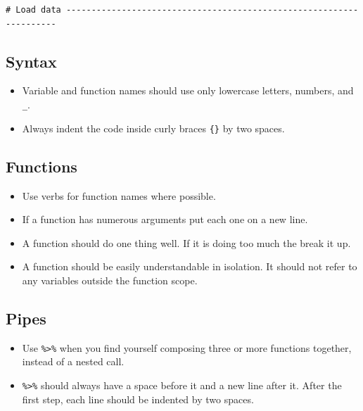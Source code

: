 \documentclass[]{book}
\providecommand{\tightlist}{%
  \setlength{\itemsep}{0pt}\setlength{\parskip}{0pt}}
\begin{document}
\begin{verbatim}
# Load data --------------------------------------------------------------------
\end{verbatim}

\hypertarget{syntax}{%
\subsection{Syntax}\label{syntax}}

\begin{itemize}
\tightlist
\item
  Variable and function names should use only lowercase letters, numbers, and \texttt{\_}.
\item
  Always indent the code inside curly braces \texttt{\{\}} by two spaces.
\end{itemize}

\hypertarget{functions}{%
\subsection{Functions}\label{functions}}

\begin{itemize}
\tightlist
\item
  Use verbs for function names where possible.
\item
  If a function has numerous arguments put each one on a new line.
\item
  A function should do one thing well. If it is doing too much the break it up.
\item
  A function should be easily understandable in isolation. It should not refer
  to any variables outside the function scope.
\end{itemize}

\hypertarget{pipes}{%
\subsection{Pipes}\label{pipes}}

\begin{itemize}
\tightlist
\item
  Use \texttt{\%\textgreater{}\%} when you find yourself composing three or more functions together,
  instead of a nested call.
\item
  \texttt{\%\textgreater{}\%} should always have a space before it and a new line after it. After the
  first step, each line should be indented by two spaces.
\end{itemize}
\end{document}
